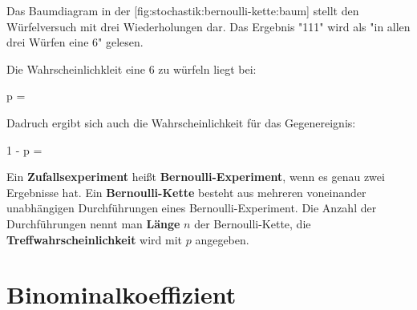 Das Baumdiagram in der [fig:stochastik:bernoulli-kette:baum]
stellt den Würfelversuch mit drei Wiederholungen dar. Das Ergebnis "111" wird
als "in allen drei Würfen eine $6$" gelesen. 

Die Wahrscheinlichkleit eine $6$ zu würfeln liegt bei:

\startformula

p = 

\stopformula

Dadruch ergibt sich auch die Wahrscheinlichkeit für das Gegenereignis:

\startformula

1 - p = 

\stopformula


\startdefinition[title={Bernoulli-Experiment}]
Ein {\bf Zufallsexperiment} heißt {\bf Bernoulli-Experiment}, wenn es genau zwei
Ergebnisse hat. Ein {\bf Bernoulli-Kette} besteht aus mehreren voneinander
unabhängigen Durchführungen eines Bernoulli-Experiment. Die Anzahl der Durchführungen nennt man {\bf Länge} $n$ der Bernoulli-Kette, die {\bf Treffwahrscheinlichkeit} wird mit $p$ angegeben.
\stopdefinition

\section{Binominalkoeffizient}
